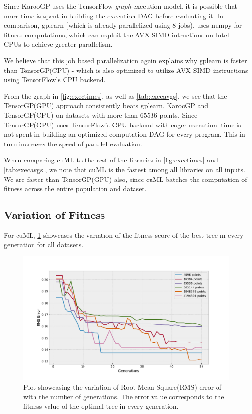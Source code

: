 Since KarooGP uses the TensorFlow \textit{graph} execution model, it is possible that more time is spent in building the execution DAG before evaluating it. In comparison, gplearn (which is already parallelized using $8$ jobs), uses numpy for fitness computations, which can exploit the AVX SIMD intructions on Intel CPUs to achieve greater parallelism. 

We believe that this job based parallelization again explains why gplearn is faster than TensorGP(CPU) - which is also optimized to utilize AVX SIMD instructions using TensorFlow's CPU backend.

From the graph in \cref*{fig:exectimes}, as well as \cref*{tab:execavgs}, we see that the TensorGP(GPU) approach consistently beats gplearn, KarooGP and TensorGP(CPU) on datasets with more than $65536$ points. Since TensorGP(GPU) uses TensorFlow's GPU backend with eager execution, time is not spent in building an optimized computation DAG for every program. This in turn increases the speed of parallel evaluation.

When comparing cuML to the rest of the libraries in \cref{fig:exectimes} and \cref{tab:execavgs}, we note that cuML is the fastest among all libraries on all inputs. We are faster than TensorGP(GPU) also, since cuML batches the computation of fitness across the entire population and dataset. 

\subsection{Variation of Fitness}
\label{subsec:fitnessvar}


For cuML, \cref{fig:besttrainfit} showcases the variation of the fitness score of the best tree in every generation for all datasets. 

\begin{figure}[htbp]
  \centering
  \includegraphics[scale=0.59]{images/RMSError.pdf}
  \caption{Plot showcasing the variation of Root Mean Square(RMS) error of with the number of generations. The error value corresponds to the fitness value of the optimal tree in every generation. }
  \label{fig:besttrainfit}
\end{figure}

